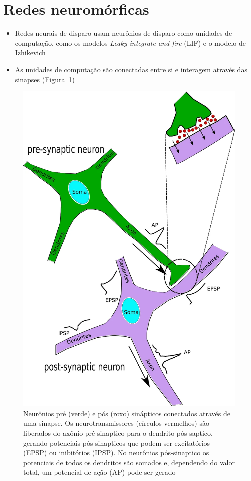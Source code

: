 

\section{Redes neuromórficas}\label{sec:redesneuromorficas}

\begin{itemize}
	\item Redes neurais de disparo usam neurônios de disparo como unidades de computação, como os modelos \textit{Leaky integrate-and-fire} (LIF) e o modelo de Izhikevich
	\item As unidades de computação são conectadas entre si e interagem através das sinapses (Figura~\ref{fig:sinapse})
\end{itemize}

\begin{figure}[htb!]
	\centering
	\caption[Neurônios pré e pós sinápticos conectados através de uma sinapse]{Neurônios pré (verde) e pós (roxo) sinápticos conectados através de uma sinapse. Os neurotransmissores (círculos vermelhos) são liberados do axônio pré-sinaptico para o dendrito pós-saptico, gerando potenciais pós-sinapticos que podem ser excitatórios (EPSP) ou inibitórios (IPSP). No neurônios pós-sinaptico os potenciais de todos os dendritos são somados e, dependendo do valor total, um potencial de ação (AP) pode ser gerado}
	\label{fig:sinapse}
	\includegraphics[width=0.3\linewidth]{figs/sinapse}
\end{figure}


